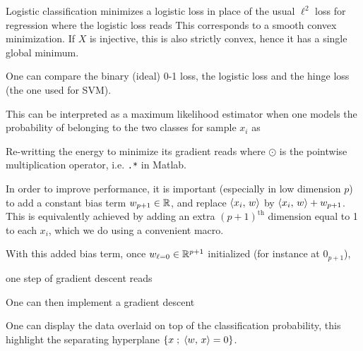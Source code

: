 
Logistic classification minimizes a logistic loss in place of the usual
$\ell^2$ loss for regression
where the logistic loss reads
This corresponds to a smooth convex minimization. If $X$ is injective,
this is also strictly convex, hence it has a single global minimum.

One can compare the binary (ideal) 0-1 loss, the logistic loss and the hinge loss (the one used for SVM).


This can be interpreted as a maximum likelihood estimator when one
models the probability of  belonging to the two classes for sample $x_i$ as

Re-writting the energy to minimize
its gradient reads
where $\odot$ is the pointwise multiplication operator, i.e. \texttt{.*} in
Matlab.


In order to improve performance, it is important (especially
in low dimension $p$) to add a constant bias term $w_{p+1} \in \mathbb{R}$, and replace $\langle x_i,\,w\rangle$
by $ \langle x_i,\,w\rangle + w_{p+1} $.  This is equivalently achieved by
adding an extra $(p+1)^{\text{th}}$ dimension equal to 1 to each
$x_i$, which we do using a convenient macro.

With this added bias term, once $w_{\ell=0} \in \mathbb{R}^{p+1}$ initialized
(for instance at $0_{p+1}$),

one step of gradient descent reads

One can then implement a gradient descent


One can display the data overlaid on top of the
classification probability, this highlight the
separating hyperplane $ \left\{ x \;;\; \langle w,\,x\rangle=0 \right\} $.




